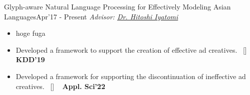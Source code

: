 \begin{projects}
\project
	{Glyph-aware Natural Language Processing for Effectively Modeling Asian Languages}{Apr'17 - Present}
	{
	    \textit{Advisor:  \href{https://iyatomi-lab.info/english/people/2013-6-8}{Dr. Hitoshi Iyatomi}}
	}
	{\begin{itemize}
	\setlength\itemsep{0.3em}
     \item hoge fuga
     \item Developed a framework to support the creation of effective ad creatives.~ [\href{https://github.com/shunk031/Multi-task-Conditional-Attention-Networks}{\small{\githubSymbol}}] ~ {\small{\lbrack\textbf{{KDD'19}}\rbrack}}
     \item Developed a framework for supporting the discontinuation of ineffective ad creatives.~ [\href{https://www.mdpi.com/2076-3417/12/7/3594}{\small{\websiteSymbol}}] ~ {\small{\lbrack\textbf{{Appl. Sci'22}}\rbrack}}
     \end{itemize}}     

\end{projects}    


